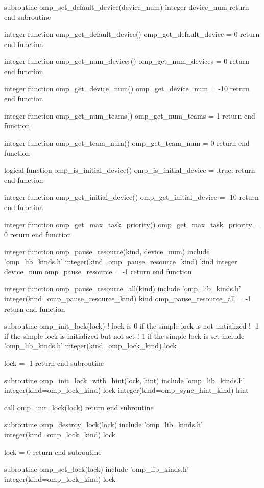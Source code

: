 {\begin{ompfFunction}
subroutine omp_set_default_device(device_num)
  integer device_num
  return
end subroutine

integer function omp_get_default_device()
  omp_get_default_device = 0
  return
end function

integer function omp_get_num_devices()
  omp_get_num_devices = 0
  return
end function

integer function omp_get_device_num()
  omp_get_device_num = -10
  return
end function

integer function omp_get_num_teams()
  omp_get_num_teams = 1
  return
end function

integer function omp_get_team_num()
  omp_get_team_num = 0
  return
end function

logical function omp_is_initial_device()
  omp_is_initial_device = .true.
  return
end function

integer function omp_get_initial_device()
  omp_get_initial_device = -10
  return
end function

integer function omp_get_max_task_priority()
  omp_get_max_task_priority = 0
  return
end function

integer function omp_pause_resource(kind, device_num)
  include 'omp_lib_kinds.h'
  integer(kind=omp_pause_resource_kind) kind
  integer device_num
  omp_pause_resource = -1
  return
end function

integer function omp_pause_resource_all(kind)
  include 'omp_lib_kinds.h'
  integer(kind=omp_pause_resource_kind) kind
  omp_pause_resource_all = -1
  return
end function

subroutine omp_init_lock(lock)
  ! lock is 0 if the simple lock is not initialized
  !        -1 if the simple lock is initialized but not set
  !         1 if the simple lock is set
  include 'omp_lib_kinds.h'
  integer(kind=omp_lock_kind) lock

  lock = -1
  return
end subroutine

subroutine omp_init_lock_with_hint(lock, hint)
  include 'omp_lib_kinds.h'
  integer(kind=omp_lock_kind) lock
  integer(kind=omp_sync_hint_kind) hint

  call omp_init_lock(lock)
  return
end subroutine

subroutine omp_destroy_lock(lock)
  include 'omp_lib_kinds.h'
  integer(kind=omp_lock_kind) lock

  lock = 0
  return
end subroutine

subroutine omp_set_lock(lock)
  include 'omp_lib_kinds.h'
  integer(kind=omp_lock_kind) lock


\end{ompfFunction}}
